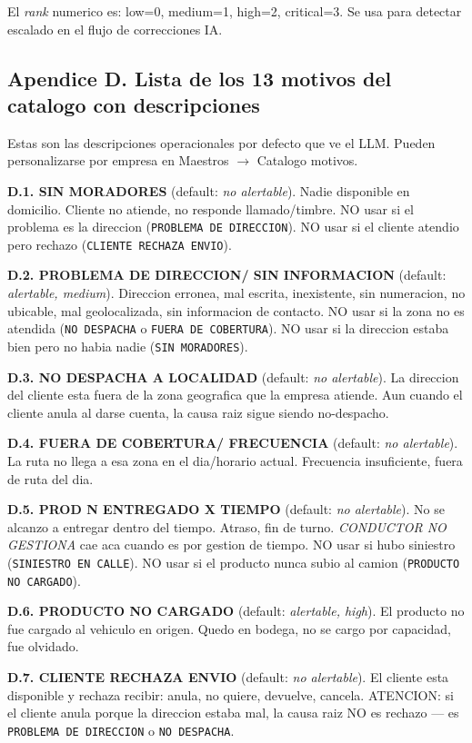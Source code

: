\documentclass[11pt,a4paper]{article}
\begin{document}
El \emph{rank} numerico es: low=0, medium=1, high=2, critical=3. Se
usa para detectar escalado en el flujo de correcciones IA.

\subsection*{Apendice D. Lista de los 13 motivos del catalogo con descripciones}

Estas son las descripciones operacionales por defecto que ve el LLM.
Pueden personalizarse por empresa en Maestros $\rightarrow$ Catalogo
motivos.

\textbf{D.1. SIN MORADORES} (default: \emph{no alertable}).
Nadie disponible en domicilio. Cliente no atiende, no responde
llamado/timbre. NO usar si el problema es la direccion (\texttt{PROBLEMA
DE DIRECCION}). NO usar si el cliente atendio pero rechazo
(\texttt{CLIENTE RECHAZA ENVIO}).

\textbf{D.2. PROBLEMA DE DIRECCION/ SIN INFORMACION} (default:
\emph{alertable, medium}).
Direccion erronea, mal escrita, inexistente, sin numeracion, no
ubicable, mal geolocalizada, sin informacion de contacto. NO usar si
la zona no es atendida (\texttt{NO DESPACHA} o \texttt{FUERA DE
COBERTURA}). NO usar si la direccion estaba bien pero no habia nadie
(\texttt{SIN MORADORES}).

\textbf{D.3. NO DESPACHA A LOCALIDAD} (default: \emph{no alertable}).
La direccion del cliente esta fuera de la zona geografica que la
empresa atiende. Aun cuando el cliente anula al darse cuenta, la causa
raiz sigue siendo no-despacho.

\textbf{D.4. FUERA DE COBERTURA/ FRECUENCIA} (default: \emph{no
alertable}). La ruta no llega a esa zona en el dia/horario actual.
Frecuencia insuficiente, fuera de ruta del dia.

\textbf{D.5. PROD N ENTREGADO X TIEMPO} (default: \emph{no alertable}).
No se alcanzo a entregar dentro del tiempo. Atraso, fin de turno.
\emph{CONDUCTOR NO GESTIONA} cae aca cuando es por gestion de tiempo.
NO usar si hubo siniestro (\texttt{SINIESTRO EN CALLE}). NO usar si el
producto nunca subio al camion (\texttt{PRODUCTO NO CARGADO}).

\textbf{D.6. PRODUCTO NO CARGADO} (default: \emph{alertable, high}).
El producto no fue cargado al vehiculo en origen. Quedo en bodega, no
se cargo por capacidad, fue olvidado.

\textbf{D.7. CLIENTE RECHAZA ENVIO} (default: \emph{no alertable}).
El cliente esta disponible y rechaza recibir: anula, no quiere,
devuelve, cancela. ATENCION: si el cliente anula porque la direccion
estaba mal, la causa raiz NO es rechazo --- es \texttt{PROBLEMA DE
DIRECCION} o \texttt{NO DESPACHA}.
\end{document}
